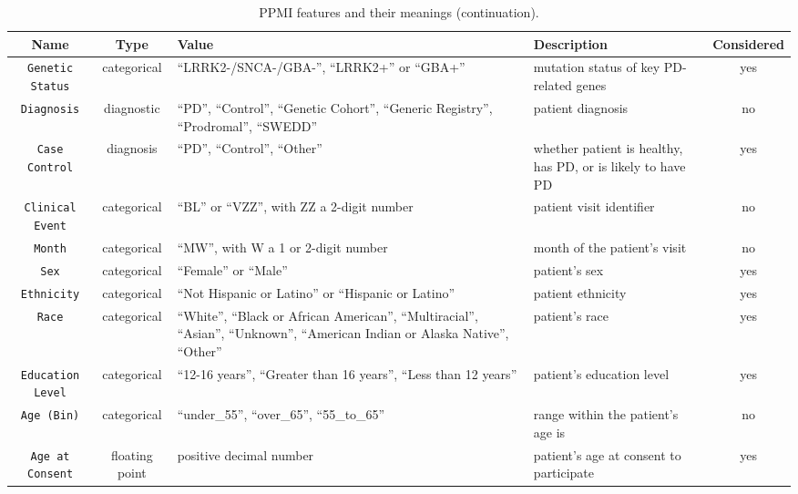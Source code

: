 \clearpage
\begin{table}[!ht]
    \centering 
    \begin{threeparttable}
    \caption{PPMI features and their meanings (continuation).}
    \begin{tabular}{c | c p{3.5cm} p{3cm} c}
        \toprule
        Name & Type & Value & Description & Considered \\ 
        \midrule
        \texttt{Genetic Status} 
            & categorical & ``LRRK2-/SNCA-/GBA-'', ``LRRK2+'' or ``GBA+'' & mutation status of key PD-related genes & yes \\ 
        \texttt{Diagnosis} 
            & diagnostic 
            & ``PD'', ``Control'', ``Genetic Cohort'', 
              ``Generic Registry'', ``Prodromal'', ``SWEDD'' 
            & patient diagnosis & no \\ 
        \texttt{Case Control} 
            & diagnosis & ``PD'', ``Control'', ``Other'' & whether patient is healthy, has PD, or is likely to have PD & yes \\ 
        \texttt{Clinical Event} 
            & categorical & ``BL'' or ``VZZ'', with ZZ a 2-digit number & patient visit identifier & no \\ 
        \texttt{Month} 
            & categorical & ``MW'', with W a 1 or 2-digit number & month of the patient's visit & no \\ 
        \texttt{Sex} 
            & categorical & ``Female'' or ``Male'' & patient's sex & yes \\ 
        \texttt{Ethnicity} 
            & categorical & ``Not Hispanic or Latino'' or ``Hispanic or Latino'' & patient ethnicity & yes \\ 
        \texttt{Race} 
            & categorical 
            & ``White'', ``Black or African American'', ``Multiracial'', 
              ``Asian'', ``Unknown'', ``American Indian or Alaska Native'', ``Other'' 
            & patient's race & yes \\ 
        \texttt{Education Level} 
            & categorical & ``12-16 years'', ``Greater than 16 years'', ``Less than 12 years'' & patient's education level & yes \\ 
        \texttt{Age (Bin)}
            & categorical & ``under\_55'', ``over\_65'', ``55\_to\_65'' & range within the patient's age is & no \\
        \texttt{Age at Consent}
            & floating point & positive decimal number & patient's age at consent to participate & yes \\

\end{tabular}
\end{threeparttable}
\end{table}
